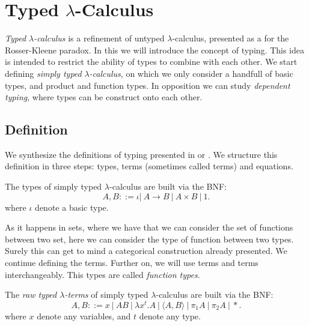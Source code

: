 \section{Typed $\lambda$-Calculus}
\emph{Typed $\lambda$-calculus} is a refinement of untyped $\lambda$-calculus, presented as a for the Rosser-Kleene paradox. In this we will introduce the concept of typing. This idea is intended to restrict the ability of types to combine with each other. We start defining \emph{simply typed }$\lambda$\emph{-calculus}, on which we only consider a handfull of basic types, and product and function types. In opposition we can study \emph{dependent typing}, where types can be construct onto each other.

\subsection{Definition}

 We synthesize the definitions of typing presented in \cite{lambek1988introduction} or \cite{selinger2008lecture}. We structure this definition in three steps: types, terms (sometimes called terms) and equations.


\begin{definition}
  The types of simply typed $\lambda$-calculus are built via the BNF:
  $$A,B ::= \iota |\ A\to B\ |\ A \times B  \ |\ 1.$$
  where $\iota$ denote a basic type. 
\end{definition}





As it happens in sets, where we have that we can consider the set of functions between two set, here we can consider the type of function between two types. Surely this can get to mind a categorical construction already presented. We continue defining the terms. Further on, we will use terms and terms interchangeably. This types are called \emph{function types}.\\




\begin{definition}
  The \emph{raw typed $\lambda$-terms} of simply typed $\lambda$-calculus are built via the BNF:
  $$A,B ::= x\ |\ AB\ |\ \lambda x^t.A \ |\ \langle A,B \rangle\ |\ \pi_1A\ |\ \pi_2A\ |\ *.$$
  where $x$ denote any variables, and $t$ denote any type. 
\end{definition}

